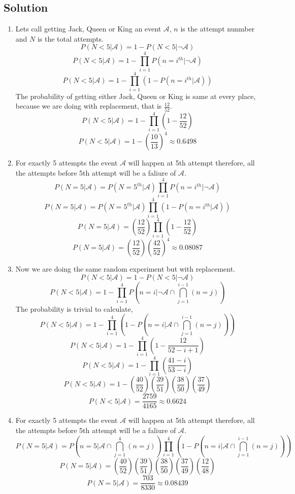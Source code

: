 \documentclass[a4paper, 11pt]{article}
\begin{document}
\subsection*{Solution}
\begin{enumerate}[label=(\alph*)]
    \item Lets call getting Jack, Queen or King an event $\mathcal{A}$, $n$ is the attempt nunmber
          and $N$ is the total attempts.
          \[P(N<5|\mathcal{A})=1-P(N<5|\neg\mathcal{A})\]
          \[P(N<5|\mathcal{A})=1-\prod_{i=1}^{4}P(n=i^{th}|\neg\mathcal{A})\]
          \[P(N<5|\mathcal{A})=1-\prod_{i=1}^{4}\left(1-P(n=i^{th}|\mathcal{A})\right)\]
          The probability of getting either Jack, Queen or King is same at every place, because we are
          doing with replacement, that is $\frac{12}{52}$.
          \[P(N<5|\mathcal{A})=1-\prod_{i=1}^{4}\left(1-\frac{12}{52}\right)\]
          \[P(N<5|\mathcal{A})=1-\left(\frac{10}{13}\right)^{4}\approx0.6498\]
    \item For exactly 5 attempts the event $\mathcal{A}$ will happen at 5th attempt therefore, all the attempts before
          5th attempt will be a faliure of $\mathcal{A}$.
          \[P(N=5|\mathcal{A})=P(N=5^{th}|\mathcal{A})\prod_{i=1}^{4}P(n=i^{th}|\neg\mathcal{A})\]
          \[P(N=5|\mathcal{A})=P(N=5^{th}|\mathcal{A})\prod_{i=1}^{4}\left(1-P\left(n=i^{th}|\mathcal{A}\right)\right)\]
          \[P(N=5|\mathcal{A})=\left(\frac{12}{52}\right)\prod_{i=1}^{4}\left(1-\frac{12}{52}\right)\]
          \[P(N=5|\mathcal{A})=\left(\frac{12}{52}\right)\left(\frac{42}{52}\right)^{4}\approx 0.08087\]
    \item Now we are doing the same random experiment but with replacement.
          \[P(N<5|\mathcal{A})=1-P(N<5|\neg\mathcal{A})\]
          \[P(N<5|\mathcal{A})=1-\prod_{i=1}^{4}P\left(n=i\bigg|\neg\mathcal{A}\cap \bigcap_{j=1}^{i-1}(n=j)\right)\]
          The probability is trivial to calculate,
          \[P(N<5|\mathcal{A})=1-\prod_{i=1}^{4}\left(1-P\left(n=i\bigg|\mathcal{A}\cap \bigcap_{j=1}^{i-1}(n=j)\right)\right)\]
          \[P(N<5|\mathcal{A})=1-\prod_{i=1}^{4}\left(1-\frac{12}{52-i+1}\right)\]
          \[P(N<5|\mathcal{A})=1-\prod_{i=1}^{4}\left(\frac{41-i}{53-i}\right)\]
          \[P(N<5|\mathcal{A})=1-\left(\frac{40}{52}\right)\left(\frac{39}{51}\right)\left(\frac{38}{50}\right)\left(\frac{37}{49}\right)\]
          \[P(N<5|\mathcal{A})=\frac{2759}{4165}\approx 0.6624\]
    \item For exactly 5 attempts the event $\mathcal{A}$ will happen at 5th attempt therefore, all the attempts before
          5th attempt will be a faliure of $\mathcal{A}$.
          \[P(N=5|\mathcal{A})=P\left(n=5\bigg|\mathcal{A}\cap \bigcap_{j=1}^{4}(n=j)\right)\prod_{i=1}^{4}\left(1-P\left(n=i\bigg|\mathcal{A}\cap \bigcap_{j=1}^{i-1}(n=j)\right)\right)\]
          \[P(N=5|\mathcal{A})=\left(\frac{40}{52}\right)\left(\frac{39}{51}\right)\left(\frac{38}{50}\right)\left(\frac{37}{49}\right)\left(\frac{12}{48}\right)\]
          \[P(N=5|\mathcal{A})=\frac{703}{8330}\approx 0.08439\]
\end{enumerate}
\end{document}
